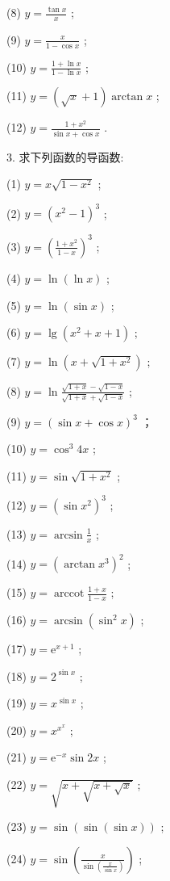 (8) \(y = \frac{\tan x}{x}\) ;

(9) \(y = \frac{x}{1 - \cos x}\) ;

(10) \(y = \frac{1 + \ln x}{1 - \ln x}\) ;

(11) \(y = \left( {\sqrt{x} + 1}\right) \arctan x\) ;

(12) \(y = \frac{1 + {x}^{2}}{\sin x + \cos x}\) .

3. 求下列函数的导函数:

(1) \(y = x\sqrt{1 - {x}^{2}}\) ;

(2) \(y = {\left( {x}^{2} - 1\right) }^{3}\) ;

(3) \(y = {\left( \frac{1 + {x}^{2}}{1 - x}\right) }^{3}\) ;

(4) \(y = \ln \left( {\ln x}\right)\) ;

(5) \(y = \ln \left( {\sin x}\right)\) ;

(6) \(y = \lg \left( {{x}^{2} + x + 1}\right)\) ;

(7) \(y = \ln \left( {x + \sqrt{1 + {x}^{2}}}\right)\) ;

(8) \(y = \ln \frac{\sqrt{1 + x} - \sqrt{1 - x}}{\sqrt{1 + x} + \sqrt{1 - x}}\) ;

(9) \(y = {\left( \sin x + \cos x\right) }^{3}\) ；

(10) \(y = {\cos }^{3}{4x}\) ;

(11) \(y = \sin \sqrt{1 + {x}^{2}}\) ;

(12) \(y = {\left( \sin {x}^{2}\right) }^{3}\) ;

(13) \(y = \arcsin \frac{1}{x}\) ;

(14) \(y = {\left( \arctan {x}^{3}\right) }^{2}\) ;

(15) \(y = \operatorname{arccot}\frac{1 + x}{1 - x}\) ;

(16) \(y = \arcsin \left( {{\sin }^{2}x}\right)\) ;

(17) \(y = {\mathrm{e}}^{x + 1}\) ;

(18) \(y = {2}^{\sin x}\) ;

(19) \(y = {x}^{\sin x}\) ;

(20) \(y = {x}^{{x}^{x}}\) ;

(21) \(y = {\mathrm{e}}^{-x}\sin {2x}\) ;

(22) \(y = \sqrt{x + \sqrt{x + \sqrt{x}}}\) ;

(23) \(y = \sin \left( {\sin \left( {\sin x}\right) }\right)\) ;

(24) \(y = \sin \left( \frac{x}{\sin \left( \frac{x}{\sin x}\right) }\right)\) ;

